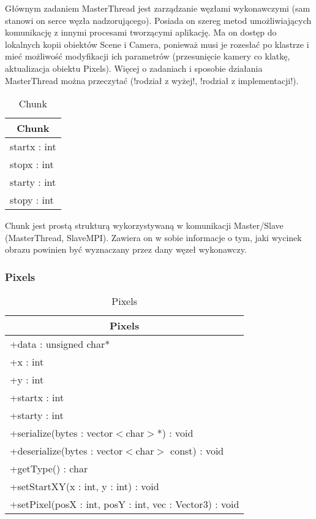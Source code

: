 Głównym zadaniem MasterThread jest zarządzanie węzłami wykonawczymi (sam stanowi on serce węzła nadzorującego). Posiada on szereg metod umożliwiających komunikację z innymi procesami tworzącymi aplikację. Ma on dostęp do lokalnych kopii obiektów Scene i Camera, ponieważ musi je rozesłać po klastrze i mieć możliwość modyfikacji ich parametrów (przesunięcie kamery co klatkę, aktualizacja obiektu Pixels). Więcej o zadaniach i sposobie działania MasterThread można przeczytać (!rodział z wyżej!, !rodział z implementacji!).

\footnotesize
\begin{longtable}{|p{14cm}|}
    \caption{Chunk} \label{tab:Chunk} \\ \hline
    \multicolumn{1}{|c|}{Chunk} \\ \hline
    startx : int \\
    stopx : int \\
    starty : int \\
    stopy : int \\
    \hline
\end{longtable}
\normalsize

Chunk jest prostą strukturą wykorzystywaną w komunikacji Master/Slave (MasterThread, SlaveMPI). Zawiera on w sobie informacje o tym, jaki wycinek obrazu powinien być wyznaczany przez dany węzeł wykonawczy.


\subsubsection{Pixels}

\footnotesize
\begin{longtable}{|p{14cm}|}
    \caption{Pixels} \label{tab:Pixels} \\ \hline
    \multicolumn{1}{|c|}{Pixels} \\ \hline
    +data : unsigned char* \\
    +x : int \\
    +y : int \\ 
    +startx : int \\
    +starty : int \\
    \hline
	+serialize(bytes : vector$<$char$>$*) : void \\
	+deserialize(bytes : vector$<$char$>$ const) : void \\
	+getType() : char \\
	+setStartXY(x : int, y : int) : void \\
	+setPixel(posX : int, posY : int, vec : Vector3) : void \\
	\hline
\end{longtable}
\normalsize

